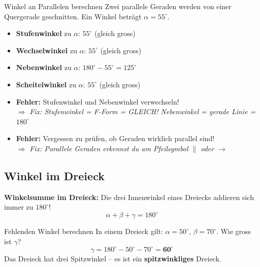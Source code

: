\documentclass[12pt, a4paper]{article}
\begin{document}
\begin{examplebox}{Winkel an Parallelen berechnen}
Zwei parallele Geraden werden von einer Quergerade geschnitten.
Ein Winkel betr\"agt $\alpha = 55^\circ$.

\begin{itemize}
  \item \textbf{Stufenwinkel} zu $\alpha$: $55^\circ$ (gleich gross)
  \item \textbf{Wechselwinkel} zu $\alpha$: $55^\circ$ (gleich gross)
  \item \textbf{Nebenwinkel} zu $\alpha$: $180^\circ - 55^\circ = 125^\circ$
  \item \textbf{Scheitelwinkel} zu $\alpha$: $55^\circ$ (gleich gross)
\end{itemize}
\end{examplebox}

\begin{fehlerbox}
\begin{itemize}
  \item \textbf{Fehler:} Stufenwinkel und Nebenwinkel verwechseln!\\
    $\Rightarrow$ \textit{Fix: Stufenwinkel = F-Form = GLEICH! \quad Nebenwinkel = gerade Linie = $180^\circ$}
  \item \textbf{Fehler:} Vergessen zu pr\"ufen, ob Geraden wirklich parallel sind!\\
    $\Rightarrow$ \textit{Fix: Parallele Geraden erkennst du am Pfeilsymbol $\parallel$ oder $\rightarrow$}
\end{itemize}
\end{fehlerbox}

\newpage

\subsection{Winkel im Dreieck}

\begin{merkbox}
\textbf{Winkelsumme im Dreieck:} Die drei Innenwinkel eines Dreiecks addieren sich immer zu $180^\circ$!
\[
  \boxed{\alpha + \beta + \gamma = 180^\circ}
\]
\end{merkbox}

\begin{examplebox}{Fehlenden Winkel berechnen}
In einem Dreieck gilt: $\alpha = 50^\circ$, $\beta = 70^\circ$. Wie gross ist $\gamma$?
\[
  \gamma = 180^\circ - 50^\circ - 70^\circ = \mathbf{60^\circ}
\]
Das Dreieck hat drei Spitzwinkel -- es ist ein \textbf{spitzwinkliges} Dreieck.
\end{examplebox}
\end{document}
